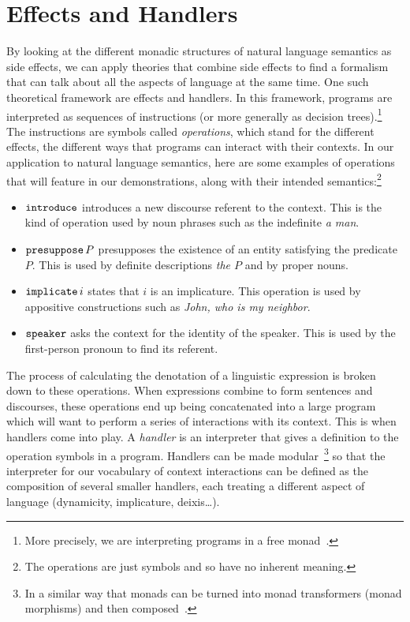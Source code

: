 \section*{Effects and Handlers}

By looking at the different monadic structures of natural language
semantics as side effects, we can apply theories that combine side effects
to find a formalism that can talk about all the aspects of language at the
same time. One such theoretical framework are effects and handlers. In this
framework, programs are interpreted as sequences of instructions (or more
generally as decision trees).\footnote{More precisely, we are interpreting
  programs in a free monad~\cite{swierstra2008data}.} The instructions are
symbols called \emph{operations}, which stand for the different effects,
the different ways that programs can interact with their contexts. In our
application to natural language semantics, here are some examples of
operations that will feature in our demonstrations, along with their
intended semantics:\footnote{The operations are just symbols and so have no
  inherent meaning.}

\begin{itemize}
\item $\mathtt{introduce}$ introduces a new discourse referent to the
  context. This is the kind of operation used by noun phrases such as the
  indefinite \emph{a man}.
\item $\mathtt{presuppose}\,P$ presupposes the existence of an entity
  satisfying the predicate $P$. This is used by definite descriptions
  \emph{the $P$} and by proper nouns.
\item $\mathtt{implicate}\,i$ states that $i$ is an implicature. This
  operation is used by appositive constructions such as \emph{John, who is
    my neighbor}.
\item $\mathtt{speaker}$ asks the context for the identity of the speaker. This
  is used by the first-person pronoun to find its referent.
\end{itemize}

The process of calculating the denotation of a linguistic expression is
broken down to these operations. When expressions combine to form sentences
and discourses, these operations end up being concatenated into a large
program which will want to perform a series of interactions with its
context. This is when handlers come into play. A \emph{handler} is an
interpreter that gives a definition to the operation symbols in a
program. Handlers can be made modular~\footnote{In a similar way that
  monads can be turned into monad transformers (monad morphisms) and then
  composed~\cite{shan2002monads,wu2015transformers}.} so that the
interpreter for our vocabulary of context interactions can be defined as
the composition of several smaller handlers, each treating a different
aspect of language (dynamicity, implicature, deixis\ldots).

